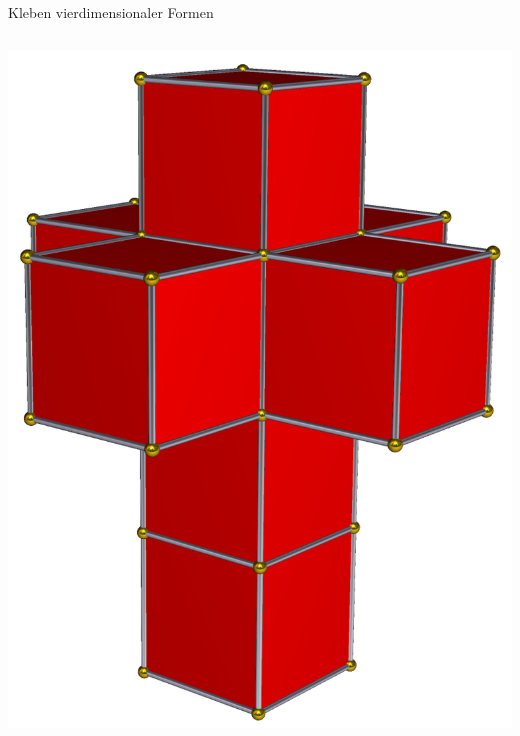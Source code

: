 \documentclass[12pt,compress,ngerman,utf8,t]{beamer}
\begin{document}
\begin{frame}{Kleben vierdimensionaler Formen}
\begin{columns}
\begin{column}{0.3\textwidth}
      \includegraphics[height=0.35\textheight]{008-cell-net}
    \end{column}
  \end{columns}
  \bigskip
  \bigskip


\end{frame}
\end{document}
